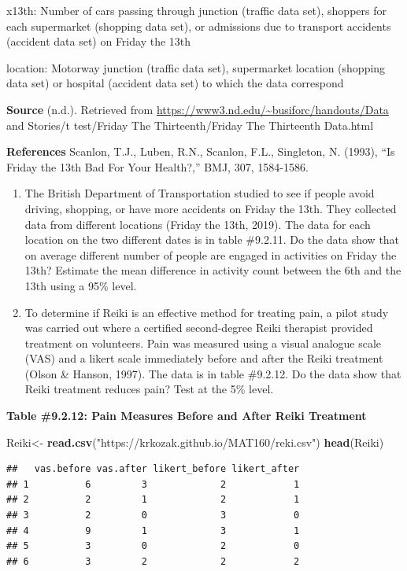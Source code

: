 \documentclass[]{book}
\newenvironment{Shaded}{\begin{snugshade}}{\end{snugshade}}
\newcommand{\KeywordTok}[1]{\textcolor[rgb]{0.13,0.29,0.53}{\textbf{#1}}}
\newcommand{\NormalTok}[1]{#1}
\newcommand{\StringTok}[1]{\textcolor[rgb]{0.31,0.60,0.02}{#1}}
\begin{document}
x13th: Number of cars passing through junction (traffic data set), shoppers for each supermarket (shopping data set), or admissions due to transport accidents (accident data set) on Friday the 13th

location: Motorway junction (traffic data set), supermarket location (shopping data set) or hospital (accident data set) to which the data correspond

\textbf{Source}
(n.d.). Retrieved from \url{https://www3.nd.edu/~busiforc/handouts/Data} and Stories/t test/Friday The Thirteenth/Friday The Thirteenth Data.html

\textbf{References}
Scanlon, T.J., Luben, R.N., Scanlon, F.L., Singleton, N. (1993), ``Is Friday the 13th Bad For Your Health?,'' BMJ, 307, 1584-1586.

\begin{enumerate}
\def\labelenumi{\arabic{enumi}.}
\setcounter{enumi}{5}
\item
  The British Department of Transportation studied to see if people avoid driving, shopping, or have more accidents on Friday the 13th. They collected data from different locations (Friday the 13th, 2019). The data for each location on the two different dates is in table \#9.2.11. Do the data show that on average different number of people are engaged in activities on Friday the 13th? Estimate the mean difference in activity count between the 6th and the 13th using a 95\% level.
\item
  To determine if Reiki is an effective method for treating pain, a pilot study was carried out where a certified second-degree Reiki therapist provided treatment on volunteers. Pain was measured using a visual analogue scale (VAS) and a likert scale immediately before and after the Reiki treatment (Olson \& Hanson, 1997). The data is in table \#9.2.12. Do the data show that Reiki treatment reduces pain? Test at the 5\% level.
\end{enumerate}

\textbf{Table \#9.2.12: Pain Measures Before and After Reiki Treatment}

\begin{Shaded}
\begin{Highlighting}[]
\NormalTok{Reiki<-}\StringTok{ }\KeywordTok{read.csv}\NormalTok{(}\StringTok{"https://krkozak.github.io/MAT160/reki.csv"}\NormalTok{)}
\KeywordTok{head}\NormalTok{(Reiki)}
\end{Highlighting}
\end{Shaded}

\begin{verbatim}
##   vas.before vas.after likert_before likert_after
## 1          6         3             2            1
## 2          2         1             2            1
## 3          2         0             3            0
## 4          9         1             3            1
## 5          3         0             2            0
## 6          3         2             2            2
\end{verbatim}
\end{document}
